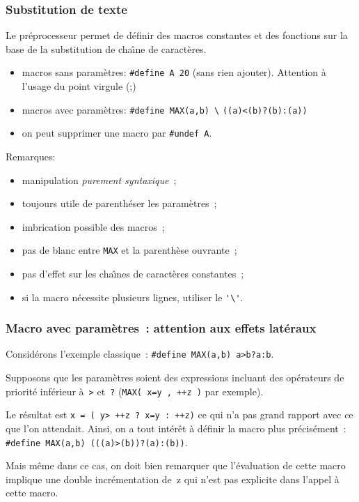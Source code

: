 \begin{frame}[fragile]
  \frametitle{Substitution de texte} Le pr\'eprocesseur permet de
  d\'efinir des macros constantes et des fonctions sur la base de la
  substitution de cha\^\i{}ne de caract\`eres.
  \begin{itemize}
  \item macros sans param\`etres: {\tt \#define A 20} (sans rien ajouter). 
    Attention \`a l'usage du point virgule (;)
  \item macros avec param\`etres: \verb+#define MAX(a,b) \+
    \hspace*{52mm}      \verb+((a)<(b)?(b):(a))+
   \item on peut supprimer une macro par {\tt \#undef A}.
\end{itemize}
 Remarques:
    \begin{itemize}
      \item manipulation {\em purement syntaxique}~;
      \item toujours utile de parenth\'eser les param\`etres~;
      \item imbrication possible des macros~;
      \item pas de blanc entre {\tt MAX} et la parenth\`ese ouvrante~;
      \item pas d'effet sur les cha\^\i{}nes de caract\`eres constantes~;
      \item si la macro n\'ecessite plusieurs lignes, utiliser le \verb+'\'+.
    \end{itemize}  
\end{frame}
\begin{frame}[fragile]
  \frametitle{Macro avec param\`etres~: attention aux effets lat\'eraux}%
  Consid\'erons l'exemple classique~: \verb+#define MAX(a,b) a>b?a:b+.
  \par\medskip
  Supposons que les param\`etres soient des expressions incluant des
  op\'erateurs de priorit\'e inf\'erieur \`a~\verb?>? et~\verb+?+ %
  (\verb?MAX( x=y , ++z )? par exemple).
\par\medskip
  Le r\'esultat est \verb|x = ( y> ++z ? x=y : ++z)| ce qui n'a pas
  grand rapport avec ce que l'on attendait. Ainsi, on a tout
  int\'er\^et \`a d\'efinir la macro plus pr\'ecis\'ement~: %
  \verb+#define MAX(a,b) (((a)>(b))?(a):(b))+.
\par\medskip
  Mais m\^eme dans ce cas, on doit bien remarquer que l'\'evaluation
  de cette macro implique une double incr\'ementation de~z qui n'est pas 
  explicite dans l'appel \`a cette macro.
\end{frame}
